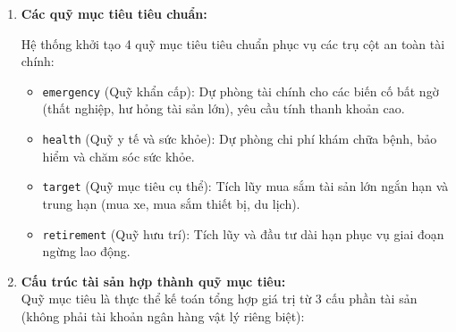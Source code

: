 \documentclass[11pt,a4paper]{article}
\providecommand{\tightlist}{
  \setlength{\itemsep}{0pt}\setlength{\parskip}{0pt}}
\begin{document}
\begin{enumerate}
\def\labelenumi{\arabic{enumi}.}
\item
  \textbf{Các quỹ mục tiêu tiêu chuẩn:}\\
  \begin{center}
  \end{center}
  Hệ thống khởi tạo 4 quỹ mục tiêu tiêu chuẩn phục vụ các trụ cột an
  toàn tài chính:

  \begin{itemize}
  \tightlist
  \item
    \texttt{emergency} (Quỹ khẩn cấp): Dự phòng tài chính cho các biến
    cố bất ngờ (thất nghiệp, hư hỏng tài sản lớn), yêu cầu tính thanh
    khoản cao.
  \item
    \texttt{health} (Quỹ y tế và sức khỏe): Dự phòng chi phí khám chữa
    bệnh, bảo hiểm và chăm sóc sức khỏe.
  \item
    \texttt{target} (Quỹ mục tiêu cụ thể): Tích lũy mua sắm tài sản lớn
    ngắn hạn và trung hạn (mua xe, mua sắm thiết bị, du lịch).
  \item
    \texttt{retirement} (Quỹ hưu trí): Tích lũy và đầu tư dài hạn phục
    vụ giai đoạn ngừng lao động.
  \end{itemize}
\item
  \textbf{Cấu trúc tài sản hợp thành quỹ mục tiêu:}\\
  Quỹ mục tiêu là thực thể kế toán tổng hợp giá trị từ 3 cấu phần tài
  sản (không phải tài khoản ngân hàng vật lý riêng biệt):


\end{enumerate}
\end{document}
